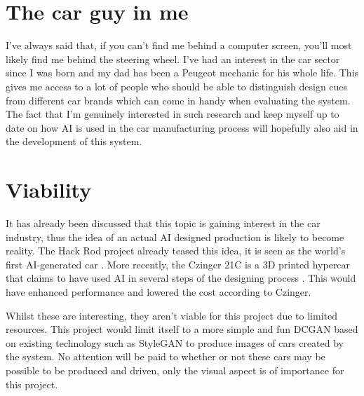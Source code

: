 
\section{The car guy in me}
\label{sec:carguy}

I've always said that, if you can't find me behind a computer screen, you'll most likely find me behind the steering wheel.
I've had an interest in the car sector since I was born and my dad has been a Peugeot mechanic for his whole life.
This gives me access to a lot of people who should be able to distinguish design cues from different car brands which can come in handy when evaluating the system.
The fact that I'm genuinely interested in such research and keep myself up to date on how AI is used in the car manufacturing process will hopefully also aid in the development of this system.  

\clearpage
\section{Viability}
\label{sec:viability}

It has already been discussed that this topic is gaining interest in the car industry, thus the idea of an actual AI designed production is likely to become reality.
The Hack Rod project already teased this idea, it is seen as the world's first AI-generated car \citep{hackrod}. 
More recently, the Czinger 21C is a 3D printed hypercar that claims to have used AI in several steps of the designing process \citep{czinger}.
This would have enhanced performance and lowered the cost according to Czinger.

Whilst these are interesting, they aren't viable for this project due to limited resources.
This project would limit itself to a more simple and fun DCGAN based on existing technology such as StyleGAN to produce images of cars created by the system.
No attention will be paid to whether or not these cars may be possible to be produced and driven, only the visual aspect is of importance for this project.